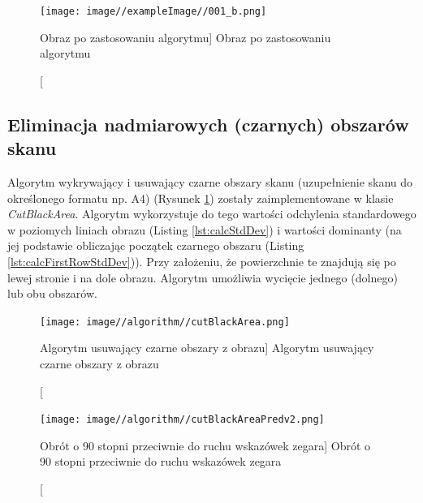 \documentclass[a4paper,12pt]{article}
\newcommand\spacingIndent{2.2em}
\begin{document}
		        \begin{figure}[!ht]  
    			    \begin{center}
    				    \texttt{[image: image//exampleImage//001\_b.png]} 
    			    \end{center}
	    		    \caption
    			        [Obraz po zastosowaniu algorytmu]  
	    		        {Obraz po zastosowaniu algorytmu}  
	            \end{figure}
		
		\subsection{Eliminacja nadmiarowych (czarnych) obszarów skanu}
			\hspace{\spacingIndent} 
			Algorytm wykrywający i usuwający czarne obszary skanu (uzupełnienie skanu do określonego formatu np. A4) (Rysunek \ref{fig:cutBlack}) zostały  zaimplementowane w klasie \textit{CutBlackArea}. Algorytm wykorzystuje do tego           wartości odchylenia standardowego w poziomych liniach obrazu (Listing \ref{lst:calcStdDev}) i wartości     dominanty (na jej podstawie obliczając początek czarnego obszaru (Listing \ref{lst:calcFirstRowStdDev})). Przy założeniu, że powierzchnie te znajdują się po lewej         stronie i na dole obrazu. Algorytm umożliwia wycięcie jednego (dolnego)     lub obu obszarów. 
			
    			\begin{figure}[!ht]  
    			    \begin{center}
    				    \texttt{[image: image//algorithm//cutBlackArea.png]} 
    			    \end{center}
    			    \caption
        			[Algorytm usuwający czarne obszary z obrazu]  
    	    		{Algorytm usuwający czarne obszary z obrazu}  
    	    		\label{fig:cutBlack}
    		    \end{figure}
		    
		        \newpage
		    
    		    \begin{figure}[!ht]  
    			    \begin{center}
    				    \texttt{[image: image//algorithm//cutBlackAreaPredv2.png]} 
    			    \end{center}
    			    \caption
            			[Obrót o 90 stopni przeciwnie do ruchu wskazówek zegara]  
        	    		{Obrót o 90 stopni przeciwnie do ruchu wskazówek zegara}
    		    \end{figure}
			
\end{document}
